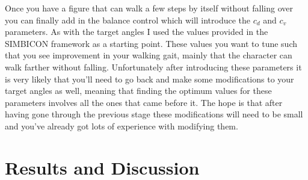 \documentclass[12pt, a4paper]{article}
\begin{document}
Once you have a figure that can walk a few steps by itself without falling over you can finally add in the balance control which will introduce the $c_d$ and $c_v$ parameters. As with the target angles I used the values provided in the SIMBICON framework as a starting point. These values you want to tune such that you see improvement in your walking gait, mainly that the character can walk farther without falling. Unfortunately after introducing these parameters it is very likely that you'll need to go back and make some modifications to your target angles as well, meaning that finding the optimum values for these parameters involves all the ones that came before it. The hope is that after having gone through the previous stage these modifications will need to be small and you've already got lots of experience with modifying them.   

\newpage
\section{Results and Discussion}
\end{document}
